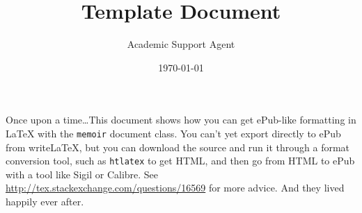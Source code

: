 \documentclass{article}
\title{Template Document}
\author{Academic Support Agent}
\date{\today}
\begin{document}
\maketitle

\maketitle

Once upon a time\ldots This document shows how you can get ePub-like formatting in \LaTeX{} with the \verb|memoir| document class. You can't yet export directly to ePub from writeLaTeX, but you can download the source and run it through a format conversion tool, such as \verb|htlatex| to get HTML, and then go from HTML to ePub with a tool like Sigil or Calibre. See \url{http://tex.stackexchange.com/questions/16569} for more advice. And they lived happily ever after.

\lipsum
\end{document}
